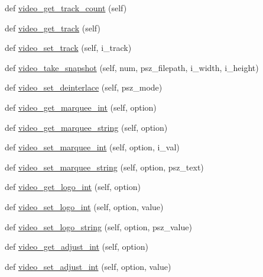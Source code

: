 \begin{DoxyCompactItemize}
def \hyperlink{classsrc_1_1lib_1_1vlc_1_1MediaPlayer_aa81a497db31fe1022cb5f2d5d656f3f9}{video\+\_\+get\+\_\+track\+\_\+count} (self)
\item 
def \hyperlink{classsrc_1_1lib_1_1vlc_1_1MediaPlayer_ad4f6297fd333972df69b63ad09ce3df4}{video\+\_\+get\+\_\+track} (self)
\item 
def \hyperlink{classsrc_1_1lib_1_1vlc_1_1MediaPlayer_a8d7e883e4d507299bd52efe563808ef0}{video\+\_\+set\+\_\+track} (self, i\+\_\+track)
\item 
def \hyperlink{classsrc_1_1lib_1_1vlc_1_1MediaPlayer_a9fc4b0d4ce4fae1203e57c7da5d437cf}{video\+\_\+take\+\_\+snapshot} (self, num, psz\+\_\+filepath, i\+\_\+width, i\+\_\+height)
\item 
def \hyperlink{classsrc_1_1lib_1_1vlc_1_1MediaPlayer_a7691374320e419218d67ce6615151231}{video\+\_\+set\+\_\+deinterlace} (self, psz\+\_\+mode)
\item 
def \hyperlink{classsrc_1_1lib_1_1vlc_1_1MediaPlayer_aef9655792be539041986467178a16d82}{video\+\_\+get\+\_\+marquee\+\_\+int} (self, option)
\item 
def \hyperlink{classsrc_1_1lib_1_1vlc_1_1MediaPlayer_aef81c069046b51b196c52fda895142d7}{video\+\_\+get\+\_\+marquee\+\_\+string} (self, option)
\item 
def \hyperlink{classsrc_1_1lib_1_1vlc_1_1MediaPlayer_af11b60c26a5f8d0b066d1f5b78212325}{video\+\_\+set\+\_\+marquee\+\_\+int} (self, option, i\+\_\+val)
\item 
def \hyperlink{classsrc_1_1lib_1_1vlc_1_1MediaPlayer_a2231a729ca9b5a7acc676307e3ce8998}{video\+\_\+set\+\_\+marquee\+\_\+string} (self, option, psz\+\_\+text)
\item 
def \hyperlink{classsrc_1_1lib_1_1vlc_1_1MediaPlayer_aea9c89452c704c06d2074af36a49c443}{video\+\_\+get\+\_\+logo\+\_\+int} (self, option)
\item 
def \hyperlink{classsrc_1_1lib_1_1vlc_1_1MediaPlayer_a5fbe973e746c02fbd0ebdbc6314bc57b}{video\+\_\+set\+\_\+logo\+\_\+int} (self, option, value)
\item 
def \hyperlink{classsrc_1_1lib_1_1vlc_1_1MediaPlayer_ae38d5ef928e3af927a1fd46349ef2c0a}{video\+\_\+set\+\_\+logo\+\_\+string} (self, option, psz\+\_\+value)
\item 
def \hyperlink{classsrc_1_1lib_1_1vlc_1_1MediaPlayer_a1b6230c194cb621f7d7bd99c8ec3d7e5}{video\+\_\+get\+\_\+adjust\+\_\+int} (self, option)
\item 
def \hyperlink{classsrc_1_1lib_1_1vlc_1_1MediaPlayer_a188335bde7440fcfdadbc82c97b579b6}{video\+\_\+set\+\_\+adjust\+\_\+int} (self, option, value)

\end{DoxyCompactItemize}
